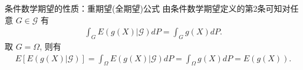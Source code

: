 \documentclass[Prob-All.tex]{subfiles}
\begin{document}
\begin{frame}{条件数学期望的性质：重期望(全期望)公式}
	\zheng 由条件数学期望定义的第2条可知对任意 $G\in \mathcal{G}$ 有
	\begin{eqnarray*}
		\int_G E(g(X)|\mathcal{G})dP=\int_G g(X)dP.
	\end{eqnarray*}
	\pause 取 $G=\Omega$, 则有
	\begin{eqnarray*}
		E[E(g(X)|\mathcal{G})]=\int_{\Omega}E(g(X)|\mathcal{G})dP=\int_{\Omega}g(X)dP=E(g(X)).
	\end{eqnarray*}


\end{frame}


\end{document}

